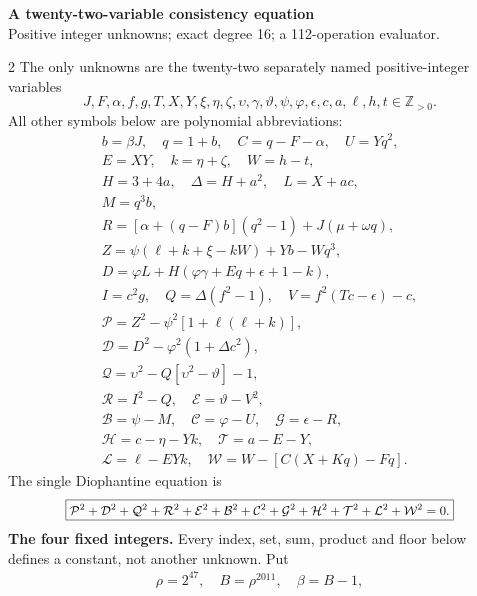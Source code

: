 \documentclass[10pt]{article}
\begin{document}
\begin{center}
{\large\bfseries A twenty-two-variable consistency equation}\\[-1pt]
{\small Positive integer unknowns; exact degree 16; a 112-operation evaluator.}
\end{center}\vspace{-8pt}
\begin{multicols}{2}
\fontsize{8.6}{9.1}\selectfont
The only unknowns are the twenty-two separately named positive-integer variables
\[
J,F,\alpha,f,g,T,X,Y,\xi,\eta,\zeta,\upsilon,\gamma,\vartheta,\psi,\varphi,\epsilon,c,a,\ell,h,t\in\mathbb Z_{>0}.
\]
All other symbols below are polynomial abbreviations:
\[
\begin{gathered}
b=\beta J,\quad q=1+b,\quad C=q-F-\alpha,\quad U=Yq^2,\\
E=XY,\quad k=\eta+\zeta,\quad W=h-t,\\
H=3+4a,\quad\Delta=H+a^2,\quad L=X+ac,\\
M=q^3b,\\
R=[\alpha+(q-F)b](q^2-1)+J(\mu+\omega q),\\
Z=\psi(\ell+k+\xi-kW)+Yb-Wq^3,\\
D=\varphi L+H(\varphi\gamma+Eq+\epsilon+1-k),\\
I=c^2g,\quad Q=\Delta(f^2-1),\quad V=f^2(Tc-\epsilon)-c,\\
\mathcal{P}=Z^2-\psi^2[1+\ell(\ell+k)],\\
\mathcal{D}=D^2-\varphi^2(1+\Delta c^2),\\
\mathcal{Q}=\upsilon^2-Q[\upsilon^2-\vartheta]-1,\\
\mathcal{R}=I^2-Q,\quad \mathcal{E}=\vartheta-V^2,\\
\mathcal{B}=\psi-M,\quad \mathcal{C}=\varphi-U,\quad \mathcal{G}=\epsilon-R,\\
\mathcal{H}=c-\eta-Yk,\quad \mathcal{T}=a-E-Y,\\
\mathcal{L}=\ell-EYk,\quad \mathcal{W}=W-[C(X+Kq)-Fq].
\end{gathered}
\]
The single Diophantine equation is
\[
\scalebox{0.9}{$\boxed{\mathcal{P}^2+\mathcal{D}^2+\mathcal{Q}^2+\mathcal{R}^2+\mathcal{E}^2+\mathcal{B}^2+\mathcal{C}^2+\mathcal{G}^2+\mathcal{H}^2+\mathcal{T}^2+\mathcal{L}^2+\mathcal{W}^2=0.}$}
\]
\textbf{The four fixed integers.}
Every index, set, sum, product and floor below defines a constant, not
another unknown. Put
\[
\begin{gathered}
\rho=2^{47},\quad B=\rho^{2011},\quad\beta=B-1,\\

\end{gathered}\]
\end{multicols}
\end{document}
